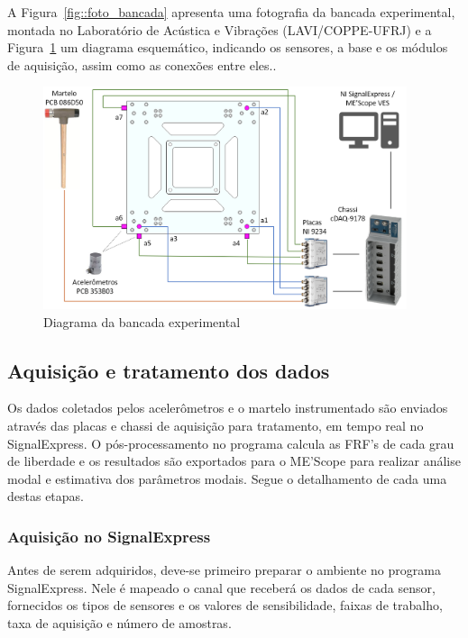 A Figura~\ref{fig::foto_bancada} apresenta uma fotografia da bancada
experimental, montada no Laboratório de Acústica e Vibrações (LAVI/COPPE-UFRJ) e
a Figura~\ref{fig::diagrama_bancada} um diagrama esquemático, indicando os
sensores, a base e os módulos de aquisição, assim como as conexões entre eles..


\begin{figure}[h]
	\centering 
 	\includegraphics[width=0.95\textwidth]{figs/diagrama_bancada}
 	\caption{Diagrama da bancada experimental}
 	\label{fig::diagrama_bancada}
\end{figure}



\subsection{Aquisição e tratamento dos dados}

Os dados coletados pelos acelerômetros e o martelo instrumentado são enviados
através das placas e chassi de aquisição para tratamento, em tempo real no
SignalExpress. O pós-processamento no programa calcula as FRF's de cada grau de
liberdade e os resultados são exportados para o ME'Scope para realizar análise
modal e estimativa dos parâmetros modais. Segue o detalhamento de cada uma
destas etapas.

\subsubsection{Aquisição no SignalExpress}

Antes de serem adquiridos, deve-se primeiro preparar o ambiente no
programa SignalExpress. Nele é mapeado o canal que receberá os dados
de cada sensor, fornecidos os tipos de sensores e os valores de sensibilidade,
faixas de trabalho, taxa de aquisição e número de amostras.


